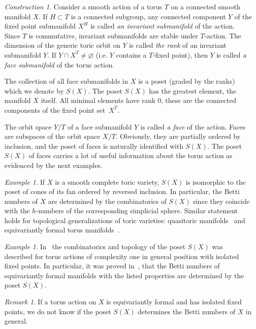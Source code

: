 \documentclass[english,12pt,oneside]{amsproc}
\newcounter{stmcounter}[section]
\numberwithin{equation}{section}
\theoremstyle{plain}
\theoremstyle{definition}
\theoremstyle{remark}
\newtheorem{ex}[stmcounter]{Example}
\newtheorem{rem}[stmcounter]{Remark}
\newtheorem{con}[stmcounter]{Construction}
\begin{document}
\begin{con}\label{conFaceSubmanifolds}
Consider a smooth action of a torus $T$ on a connected smooth manifold $X$. If $H\subset T$ is a connected subgroup, any connected component $Y$ of the fixed point submanifold $X^H$ is called \emph{an invariant submanifold} of the action. Since $T$ is commutative, invariant submanifolds are stable under $T$-action. The dimension of the generic toric orbit on $Y$ is called \emph{the rank} of an invariant submanifold $Y$. If $Y\cap X^T\neq\varnothing$ (i.e. $Y$ contains a $T$-fixed point), then $Y$ is called \emph{a face submanifold} of the torus action.

The collection of all face submanifolds in $X$ is a poset (graded by the ranks) which we denote by $S(X)$. The poset $S(X)$ has the greatest element, the manifold $X$ itself. All minimal elements have rank $0$, these are the connected components of the fixed point set~$X^T$.

The orbit space $Y/T$ of a face submanifold $Y$ is called \emph{a face} of the action. Faces are subspaces of the orbit space $X/T$. Obviously, they are partially ordered by inclusion, and the poset of faces is naturally identified with $S(X)$. The poset $S(X)$ of faces carries a lot of useful information about the torus action as evidenced by the next examples.
\end{con}

\begin{ex}
If $X$ is a smooth complete toric variety, $S(X)$ is isomorphic to the poset of cones of its fan ordered by reversed inclusion. In particular, the Betti numbers of $X$ are determined by the combinatorics of $S(X)$ since they coincide with the $h$-numbers of the corresponding simplicial sphere. Similar statement holds for topological generalizations of toric varieties: quasitoric manifolds~\cite{DJ} and equivariantly formal torus manifolds~\cite{MasPan}.
\end{ex}

\begin{ex}
In~\cite{AyzCompl,AyzMasEquiv} the combinatorics and topology of the poset $S(X)$ was described for torus actions of complexity one in general position with isolated fixed points. In particular, it was proved in~\cite{AyzMasEquiv}, that the Betti numbers of equivariantly formal manifolds with the listed properties are determined by the poset $S(X)$.
\end{ex}

\begin{rem}
If a torus action on $X$ is equivariantly formal and has isolated fixed points, we do not know if the poset $S(X)$ determines the Betti numbers of $X$ in general.
\end{rem}
\end{document}
